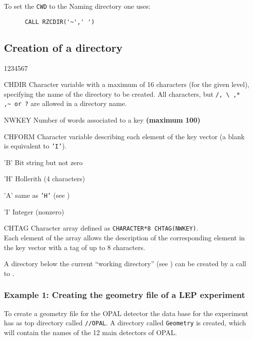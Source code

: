 To set the {\tt CWD} to the Naming directory one uses:

\begin{verbatim}
      CALL RZCDIR('~',' ')
\end{verbatim}

\subsection{Creation of a directory}

\begin{DLtt}{1234567}
\item[CHDIR]Character variable with a maximum of 16 characters (for the given
level), specifying the name of the directory to be
created. All characters, but \verb!/, \ ,* ,~ or ?!
are allowed in a directory name.
\item[NWKEY]Number of words associated to a key {\bf (maximum 100)}
\item[CHFORM]Character variable describing each element of the key vector
(a blank is equivalent to {\tt'I'}).
\begin{DLtt}{12}
\item['B'] Bit string but not zero
\item['H'] Hollerith (4 characters)
\item['A'] same as {\tt'H'} (see )
\item['I'] Integer (nonzero)
\end{DLtt}
\item[CHTAG] Character array defined as {\tt CHARACTER*8 CHTAG(NWKEY)}.\\
Each element of the array allows the description of the corresponding
element in the key vector with a tag of up to 8 characters.
\end{DLtt}

A directory below the current ``working directory'' (see )
can be created by a call to .

\subsubsection*{Example 1: Creating the geometry file of a LEP experiment}

To create a geometry file for the OPAL detector
the data base for the experiment has as top directory called
{\tt //OPAL}.
A directory called {\tt Geometry} is created, which will contain
the names of the 12 main detectors of OPAL.


